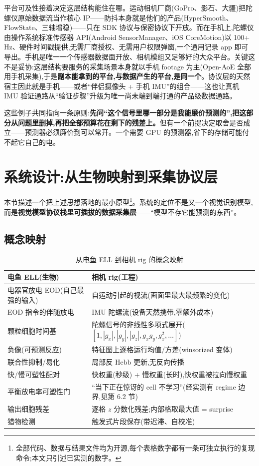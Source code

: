 \documentclass[UTF8,12pt,a4paper]{ctexart}
\begin{document}
平台可及性接着决定这层结构能住在哪。运动相机厂商(GoPro、影石、大疆)把陀螺仪原始数据流当作核心 IP——防抖本身就是他们的产品(HyperSmooth、FlowState、三轴增稳)——只在 SDK 协议与保密协议下开放。而在手机上,陀螺仪由操作系统标准传感器 API(Android SensorManager、iOS CoreMotion)以 100+ Hz、硬件时间戳提供,无需厂商授权、无需用户权限弹窗,一个通用记录 app 即可导出。手机是唯一一个传感器数据面开放、相机模组又足够好的大众平台。关键这不是妥协:这层结构要服务的采集场景本身就以手机 footage 为主(Open-AoE\cite{openaoe} 全部用手机采集),于是\textbf{副本能拿到的平台,与数据产生的平台,是同一个}。协议层的天然宿主因此就是手机——或者``伴侣摄像头 + 手机 IMU''的组合——这也让真机 IMU 验证通路从``验证步骤''升级为唯一尚未端到端打通的产品级数据通路。

这些例子共同指向一条原则:\textbf{先问``这个信号里哪一部分是我能廉价预测的'',把这部分从问题里删掉,再把全部预算花在剩下的残差上。}但有一个前提决定取舍是否成立——预测器必须廉价到可以常开。一个需要 GPU 的预测器,省下的存储可能付不起它自己的电。

\section{系统设计:从生物映射到采集协议层}

本节描述一个把上述思想落地的最小原型\footnote{全部代码、数据与结果文件均为开源,每个表格数字都有一条可独立执行的复现命令;本文只引述已实测的数字。}。系统的定位不是又一个视觉识别模型,而是\textbf{视觉模型协议栈里可插拔的数据采集层}——``模型不存它能预测的东西''。

\subsection{概念映射}

\begin{table}[htbp]
  \centering
  \small
  \caption{从电鱼 ELL 到相机 rig 的概念映射}
  \label{tab:mapping}
  \begin{tabular}{p{4.4cm}p{8.6cm}}
    \toprule
    电鱼 ELL(生物) & 相机 rig(工程) \\
    \midrule
    电器官放电 EOD(自己最强的输入) & 自运动引起的视流(画面里最大最频繁的变化) \\
    EOD 指令的伴随放电 & IMU 陀螺流(设备天然携带,零额外成本) \\
    颗粒细胞时间基 & 陀螺信号的非线性多项式展开($[1, |g_x|, |g_y|, |g_z|, g_x g_y, g_x^2, \dots]$) \\
    负像(可预测反应) & 特征图上逐格运行均值/方差(winsorized 变体) \\
    联合性抑制/易化 & 局部反 Hebb 更新,无反向传播 \\
    快/慢可塑性配对 & 快权重(秒级) + 慢权重(长时),快权重被拉向慢权重 \\
    平衡放电率可塑性门 & ``当下正在惊讶的 cell 不学习''(经实测有 regime 边界,见第 6.2 节) \\
    输出细胞残差 & 逐格 $z$ 分数化残差;内部格取最大值 = surprise \\
    猎物检测 & 触发式片段保存(带迟滞、自校准) \\
    \bottomrule
  \end{tabular}
\end{table}
\end{document}
